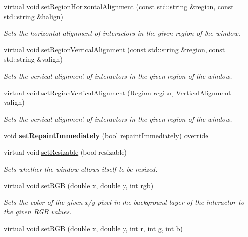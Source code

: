 \begin{DoxyCompactItemize}
virtual void \mbox{\hyperlink{classGWindow_aefb97090ff4e149f8a0cce9efee3c451}{set\+Region\+Horizontal\+Alignment}} (const std\+::string \&region, const std\+::string \&halign)
\begin{DoxyCompactList}\small\item\em Sets the horizontal alignment of interactors in the given region of the window. \end{DoxyCompactList}\item 
virtual void \mbox{\hyperlink{classGWindow_afbe22d897ce8ef25db52cbc3d456aa0a}{set\+Region\+Vertical\+Alignment}} (const std\+::string \&region, const std\+::string \&valign)
\begin{DoxyCompactList}\small\item\em Sets the vertical alignment of interactors in the given region of the window. \end{DoxyCompactList}\item 
virtual void \mbox{\hyperlink{classGWindow_a1efb2d3b67fb479aad27a6c0032ee70e}{set\+Region\+Vertical\+Alignment}} (\mbox{\hyperlink{classGWindow_a81a01a86de31071a92e6cce0bab9bc4b}{Region}} region, Vertical\+Alignment valign)
\begin{DoxyCompactList}\small\item\em Sets the vertical alignment of interactors in the given region of the window. \end{DoxyCompactList}\item 
void {\bfseries set\+Repaint\+Immediately} (bool repaint\+Immediately) override
\item 
virtual void \mbox{\hyperlink{classGWindow_a8bf0c7d9f9aea44fa74f63a358df7d22}{set\+Resizable}} (bool resizable)
\begin{DoxyCompactList}\small\item\em Sets whether the window allows itself to be resized. \end{DoxyCompactList}\item 
virtual void \mbox{\hyperlink{classGDrawingSurface_a8bcbd65fa784bdab1e66a9efd381162d}{set\+R\+GB}} (double x, double y, int rgb)
\begin{DoxyCompactList}\small\item\em Sets the color of the given x/y pixel in the background layer of the interactor to the given R\+GB values. \end{DoxyCompactList}\item 
virtual void \mbox{\hyperlink{classGDrawingSurface_a81202471d4fc9f2015aef0bc073acfab}{set\+R\+GB}} (double x, double y, int r, int g, int b)

\end{DoxyCompactItemize}
